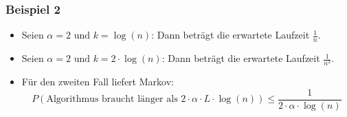 \documentclass{scrartcl}%
\begin{document}
    \subsubsection*{Beispiel 2}
    \begin{itemize}
        \item Seien $\alpha = 2 \text{ und } k=\log(n)$: Dann beträgt die erwartete Laufzeit $\frac{1}{n}$.
        \item Seien $\alpha = 2 \text{ und } k= 2\cdot\log(n) $: Dann beträgt die erwartete Laufzeit $\frac{1}{n^2}$.
        \item [] Für den zweiten Fall liefert Markov:
        \begin{equation*}
            P(\text{Algorithmus braucht länger als } 2\cdot\alpha\cdot L \cdot \log(n)) \leq \frac{1}{2\cdot\alpha\cdot \log(n)}
        \end{equation*}
    \end{itemize}
\end{document}
